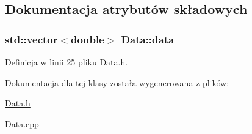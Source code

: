 \subsection{\-Dokumentacja atrybutów składowych}
\hypertarget{class_data_a375ee0846e20237e857df59893228b68}{
\subsubsection[{data}]{\setlength{\rightskip}{0pt plus 5cm}std\-::vector$<$double$>$ {\bf \-Data\-::data}}}\label{class_data_a375ee0846e20237e857df59893228b68}


\-Definicja w linii 25 pliku \-Data.\-h.



\-Dokumentacja dla tej klasy została wygenerowana z plików\-:\begin{DoxyCompactItemize}
\item 
\hyperlink{_data_8h}{\-Data.\-h}\item 
\hyperlink{_data_8cpp}{\-Data.\-cpp}\end{DoxyCompactItemize}
